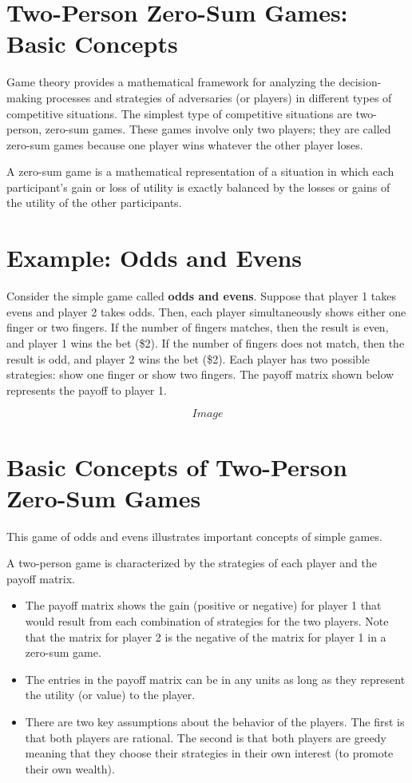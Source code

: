\documentclass[]{report}
\begin{document}

\section{Two-Person Zero-Sum Games: Basic Concepts}

Game theory provides a mathematical framework for analyzing the decision-making processes and strategies of adversaries (or players) in different types of competitive situations. The simplest type of competitive situations are two-person, zero-sum games. These games involve only two players; they are called zero-sum games because one player wins whatever the other player loses.


\begin{framed}
A zero-sum game is a mathematical representation of a situation in which each participant's gain or loss of utility is exactly balanced by the losses or gains of the utility of the other participants.
\end{framed}

\section{Example: Odds and Evens}
Consider the simple game called \textbf{odds and evens}. Suppose that player 1 takes evens and player 2 takes odds. Then, each player simultaneously shows either one finger or two fingers. If the number of fingers matches, then the result is even, and player 1 wins the bet (\$2). If the number of fingers does not match, then the result is odd, and player 2 wins the bet (\$2). Each player has two possible strategies: show one finger or show two fingers. The payoff matrix shown below represents the payoff to player 1.

\[Image\]


\section{Basic Concepts of Two-Person Zero-Sum Games}
This game of odds and evens illustrates important concepts of simple games.

A two-person game is characterized by the strategies of each player and the payoff matrix.

\begin{itemize}
\item The payoff matrix shows the gain (positive or negative) for player 1 that would result from each combination of strategies for the two players. Note that the matrix for player 2 is the negative of the matrix for player 1 in a zero-sum game.
\item The entries in the payoff matrix can be in any units as long as they represent the utility (or value) to the player.
\item There are two key assumptions about the behavior of the players. The first is that both players are rational. The second is that both players are greedy meaning that they choose their strategies in their own interest (to promote their own wealth).
\end{itemize}
\end{document}
